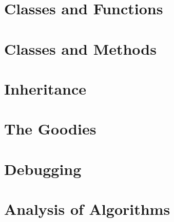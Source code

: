 \documentclass[a4paper,11pt]{book}
\begin{document}
\chapter{Classes and Functions}
\chapter{Classes and Methods}
\chapter{Inheritance}
\chapter{The Goodies}
\chapter{Debugging}
\chapter{Analysis of Algorithms}
\end{document}
